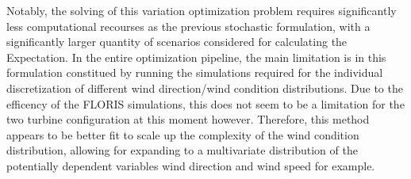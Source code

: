 Notably, the solving of this variation optimization problem requires significantly less computational recourses as the previous stochastic formulation, with a significantly larger quantity of scenarios considered for calculating the Expectation. In the entire optimization pipeline, the main limitation is in this formulation constitued by running the simulations required for the individual discretization of different wind direction/wind condition distributions. Due to the efficency of the FLORIS simulations, this does not seem to be a limitation for the two turbine configuration at this moment however. Therefore, this method appears to be better fit to scale up the complexity of the wind condition distribution, allowing for expanding to a multivariate distribution of the potentially dependent variables wind direction and wind speed for example. 

%
%
%
%
%
%
%


